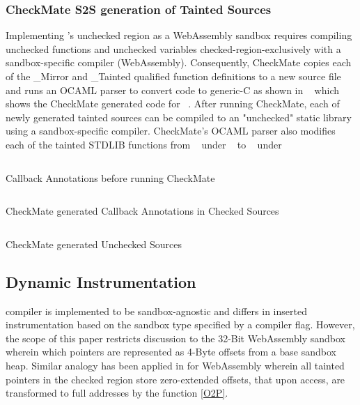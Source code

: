 \subsubsection{\textbf{CheckMate S2S generation of Tainted Sources}}
Implementing \systemname's unchecked region as a WebAssembly sandbox requires compiling unchecked functions and unchecked variables checked-region-exclusively with a sandbox-specific compiler (WebAssembly). Consequently, CheckMate copies each of the \_Mirror and \_Tainted qualified function definitions to a new source file and runs an OCAML parser to convert \systemname code to generic-C as shown in ~ which shows the CheckMate generated code for ~.
After running CheckMate, each of newly generated tainted sources can be compiled to an "unchecked" static library using a sandbox-specific compiler.
CheckMate's OCAML parser also modifies each of the tainted STDLIB functions from ~ under ~ to ~ under ~

\begin{listing}
\inputminted[mathescape, escapeinside=||, fontsize=\tiny{}]{c}{examples/callback_mechanism_sample_before_checkmate.c}
\caption{Callback Annotations before running CheckMate}
\label{lst:callbackBefore}
\end{listing}
\begin{listing}[t!]
\inputminted[mathescape, escapeinside=||, fontsize=\tiny{}]{c}{examples/callback_mechanism_sample_after_checkmate.c}
\caption{CheckMate generated Callback Annotations in Checked Sources }
\label{lst:callbackAfter}
\end{listing}
\begin{listing}[t!]
\inputminted[mathescape, escapeinside=||, fontsize=\tiny{}]{c}{examples/callback_mechanism_sample_after_checkmate_tainted.c}
\caption{CheckMate generated Unchecked Sources }
\label{lst:callbackAfterTainted}
\end{listing}

\subsection{\systemname Dynamic Instrumentation}
\systemname compiler is implemented to be sandbox-agnostic and differs in inserted instrumentation based on the sandbox type specified by a compiler flag. However, the scope of this paper restricts discussion to the 32-Bit WebAssembly sandbox wherein which pointers are represented as 4-Byte offsets from a base sandbox heap. Similar analogy has been applied in \systemname for WebAssembly wherein all tainted pointers in the checked region store zero-extended offsets, that upon access, are transformed to full addresses by the function \ref{O2P}.   
